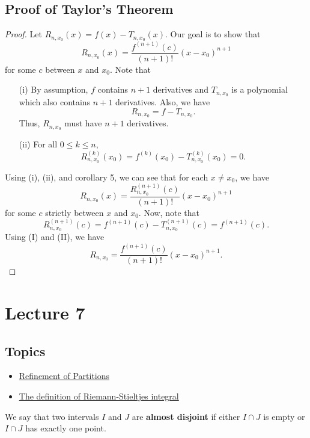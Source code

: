 \subsection{Proof of Taylor's Theorem}
\begin{proof}
Let \( {R}_{n,{x}_{0}}(x) = f(x) - {T}_{n,{x}_{0}}(x)  \). Our goal is to show that 
\[  {R}_{n,{x}_{0}}(x) = \frac{ f^{(n+1)}(c) }{ (n+1)! } (x - {x}_{0})^{n+1} \]
for some \( c  \) between \( x  \) and \( {x}_{0} \). Note that 
\begin{enumerate}
    \item[(i)] By assumption, \( f \) contains \( n + 1  \) derivatives and \( {T}_{n,{x}_{0}}  \) is a polynomial which also contains \( n + 1  \) derivatives. Also, we have 
        \[  {R}_{n,{x}_{0}} = f - {T}_{n,{x}_{0}}. \]
        Thus, \( {R}_{n,{x}_{0}}  \) must have \( n + 1  \) derivatives.
    \item[(ii)] For all \( 0 \leq k \leq n  \),
        \[  {R}_{n, {x}_{0}}^{(k)}({x}_{0}) = f^{(k)}({x}_{0}) - {T}_{n,{x}_{0}}^{(k)}({x}_{0}) = 0. \]
\end{enumerate}
Using (i), (ii), and corollary 5, we can see that for each \( x \neq {x}_{0} \), we have 
\[  R_{n,{x}_{0}}(x) = \frac{ {R}_{n,{x}_{0}}^{(n+1)}(c) }{ (n+1)! }  (x - {x}_{0})^{n+1} \tag{I} \]
for some \( c  \) strictly between \( x  \) and \( {x}_{0} \). Now, note that 
\[  {R}_{n,{x}_{0}}^{(n+1)}(c) = f^{(n+1)}(c) - {T}_{n,{x}_{0}}^{(n+1)}(c) = f^{(n+1)}(c). \tag{II}  \]
Using (I) and (II), we have 
\[  {R}_{n,{x}_{0}} = \frac{ f^{(n+1)}(c) }{ (n+1)! } (x - {x}_{0})^{n+1}.\]
\end{proof}

\section{Lecture 7}

\subsection{Topics}

\begin{itemize}
    \item {\hyperref[Refinement of Partitions]{Refinement of Partitions}}
    \item {\hyperref[The definition of Riemann-Stieltjes integral]{The definition of Riemann-Stieltjes integral}}
\end{itemize}

\begin{definition}
    We say that two intervals \( I  \) and \( J  \) are \textbf{almost disjoint} if either \( I \cap J  \) is empty or \(  I \cap J  \) has exactly one point.
\end{definition}

